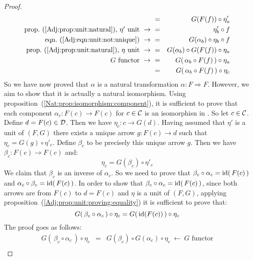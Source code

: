 \begin{proof}
\begin{eqnarray*}
            &=&G(F(f))\circ\eta'_{a}\\
            \mbox{prop.~(\ref{Adj:prop:unit:natural}), $\eta'$ unit}\ \to\ 
            &=&\eta'_{b}\circ f\\
            \mbox{eqn.~(\ref{Adj:eqn:unit:not:unique})}\ \to\ 
            &=&G(\alpha_{b})\circ\eta_{b}\circ f\\
            \mbox{prop.~(\ref{Adj:prop:unit:natural}), $\eta$ unit}\ \to\ 
            &=&G(\alpha_{b})\circ G(F(f))\circ\eta_{a}\\
            \mbox{$G$ functor}\ \to\ 
            &=&G(\,\alpha_{b}\circ F(f)\,)\circ\eta_{a}\\
            &=&G(\,\alpha_{b}\circ F(f)\,)\circ\eta_{c}\\
        \end{eqnarray*}
    So we have now proved that $\alpha$ is a natural transformation
    $\alpha:F\Rightarrow F$. However, we aim to show that it is actually
    a natural isomorphism. 
    Using proposition~(\ref{Nat:prop:isomorphism:component}), it is sufficient
    to prove that each component $\alpha_{c}:F(c)\to F(c)$ for $c\in\mbox{$\cal C$}$ is 
    an isomorphisn in \Dat. So let $c\in\mbox{$\cal C$}$. Define $d=F(c)\in\mbox{$\cal D$}$. Then we 
    have $\eta_{c}:c\to G(d)$. Having assumed that $\eta'$ is a unit of $(F,G)$ 
    there exists a unique arrow $g:F(c)\to d$ such that 
    $\eta_{c}=G(g)\circ\eta'_{c}$. Define $\beta_{c}$ to be precisely this 
    unique arrow $g$. Then we have $\beta_{c}:F(c)\to F(c)$ and:
        \begin{equation}\label{Adj:eqn:counit:not:unique:2}
            \eta_{c}=G(\beta_{c})\circ\eta'_{c}
        \end{equation}
    We claim that $\beta_{c}$ is an inverse of $\alpha_{c}$. So we need to prove 
    that $\beta_{c}\circ\alpha_{c}=\mbox{\rm id}(\,F(c)\,)$ and 
    $\alpha_{c}\circ\beta_{c}=\mbox{\rm id}(\,F(c)\,)$.
    In order to show that $\beta_{c}\circ\alpha_{c}=\mbox{\rm id}(\,F(c)\,)$, since both 
    arrows are from $F(c)$ to $d=F(c)$ and $\eta$ is a unit of $(F,G)$, applying
    proposition~(\ref{Adj:prop:unit:proving:equality}) it is sufficient to prove 
    that:
        \[
            G(\,\beta_{c}\circ\alpha_{c}\,)\circ\eta_{c} 
            = 
            G(\,\mbox{\rm id}(F(c))\,)\circ\eta_{c}
        \]
    The proof goes as follows:
        \begin{eqnarray*}G(\,\beta_{c}\circ\alpha_{c}\,)\circ\eta_{c}
            &=&G(\beta_{c})\circ G(\alpha_{c})\circ\eta_{c}
            \ \leftarrow\ \mbox{$G$ functor}\\

\end{eqnarray*}
\end{proof}
